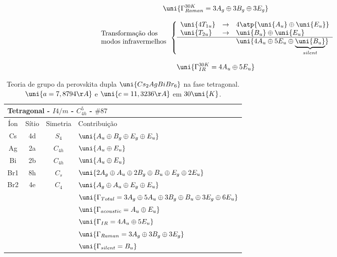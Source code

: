 \begin{equation}
	\uni{\Gamma_{Raman}^{30 K} = 3A_{g} \oplus 3B_{g} \oplus 3E_{g}}
	\label{gamma_raman_30}
\end{equation}

$$
	\begin{array}{l}
		\mbox{Transformação dos} \\
		\mbox{modos infravermelhos}
	\end{array}
	\left\{
		\begin{array}{lll}
			\uni{4T_{1u}} & \rightarrow & 4\atp{\uni{A_{u}} \oplus \uni{E_{u}}} \\
			\uni{T_{2u}} & \rightarrow & \uni{B_{u}} \oplus \uni{E_{u}} \\ \hline 
			& & \uni{4A_{u} \oplus 5E_{u} \oplus \underbrace{\uni{B_{u}}}_{silent}}
		\end{array}
	\right.
	\label{IR_modes_transform}
$$

\begin{equation}
	\uni{\Gamma_{IR}^{30 K} = 4A_{u} \oplus 5E_{u}}
	\label{gamma_ir_30}
\end{equation}


\begin{table}[hb] \centering
	\begin{tabular}{cccl} \hline \hline
	    \multicolumn{4}{l}{Tetragonal - $I4/m$ - $C^5_{4h}$ - $\#87$}
	    \\ \hline
		Íon & Sítio & Simetria & Contribuição \\ \hline
		Cs & 4d & $S_{4}$ & $\uni{A_{u} \oplus B_{g} \oplus E_{g} \oplus E_{u}}$ \\
		Ag & 2a & $C_{4h}$ & $\uni{A_{u} \oplus E_{u}}$ \\
		Bi & 2b & $C_{4h}$ & $\uni{A_{u} \oplus E_{u}}$ \\
		Br1 & 8h & $C_{s}$ & $\uni{2A_{g} \oplus A_{u} \oplus 2B_{g} \oplus B_{u} \oplus E_{g} \oplus 2E_{u}}$ \\ 
		Br2 & 4e & $C_{4}$ & $\uni{A_{g} \oplus A_{u} \oplus E_{g} \oplus E_{u}}$ \\ \hline
		&  &  & $\uni{\Gamma_{Total} = 3A_{g} \oplus 5A_{u} \oplus 3B_{g} \oplus B_{u} \oplus 3E_{g} \oplus 6E_{u}}$ \\
		&  &  & $\uni{\Gamma_{acoustic} = A_{u} \oplus E_{u}}$ \\
		&  &  & $\uni{\Gamma_{IR} = 4A_{u} \oplus 5E_{u}}$ \\
		&  &  & $\uni{\Gamma_{Raman} = 3A_{g} \oplus 3B_{g} \oplus 3E_{g}}$ \\
		&  &  & $\uni{\Gamma_{silent} = B_{u}}$ \\ \hline \hline
	\end{tabular}
	\caption{Teoria de grupo da perovskita dupla $\uni{Cs_2 Ag Bi Br_6}$ na fase tetragonal. $\uni{a = 7,8794\AA}$ e $\uni{c = 11,3236\AA}$ em $30 \uni{K}$.}
	\label{tab_tetragonal}
\end{table}
 
